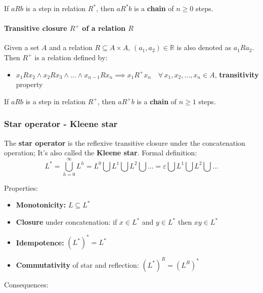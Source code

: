 \documentclass[english]{article}
\begin{document}
If \(a R b\) is a step in relation \(R^\ast\), then \(a R^\ast b\) is a \textbf{chain} of \(n \geq 0\) steps.

\paragraph[Transitive closure R+ of relation R]{Transitive closure \(R^+\) of a relation \(R\)}

Given a set \(A\) and a relation \(R \subseteq A \times A, \, (a_1, a_2) \in \mathbb{R}\) is also denoted as \(a_1 R a_2\).
Then \(R^+\) is a relation defined by:

\begin{itemize}
  \item \(x_1 R x_2 \land x_2 R x_3 \land \ldots \land x_{n-1} R x_n \implies x_1 R^+ x_n \quad \forall \, x_1, x_2, \ldots, x_n \in A\), \textbf{transitivity} property
\end{itemize}

If \(a R b\) is a step in relation \(R^+\), then \(a R^+ b\) is a \textbf{chain} of \(n \geq 1\) steps.

\subsubsection{Star operator - Kleene star}

The \textbf{star operator} is the reflexive transitive closure under the concatenation operation;
It's also called the \textbf{Kleene star}.
Formal definition:
\[ L^\ast = \bigcup_{h=0}^{\infty} L^h = L^0 \bigcup L^1 \bigcup L^2 \bigcup \ldots = \varepsilon \bigcup L^1 \bigcup L^2
  \bigcup \ldots \]

\bigskip
Properties:

\begin{itemize}
  \item \textbf{Monotonicity:} \(L \subseteq L^\ast\)
  \item \textbf{Closure} under concatenation: if \(x \in L^\ast\) and \(y \in L^\ast\) then \(xy \in L^\ast\)
  \item \textbf{Idempotence:} \(\left(L^\ast\right)^\ast = L^\ast\)
  \item \textbf{Commutativity} of star and reflection: \(\left(L^\ast\right)^R = \left(L^R\right)^\ast\)

\end{itemize}

\bigskip
Consequences:
\end{document}
